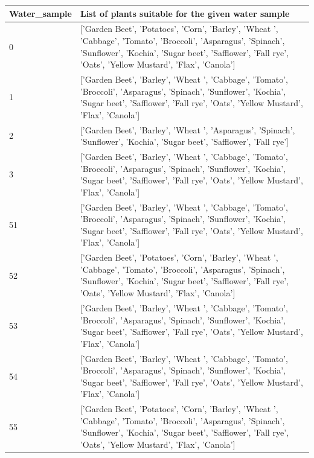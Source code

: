 \begin{table}[H]
    \centering
    \begin{tabular}{|m{}|m{}|}
    \hline
        \textbf{Water\_sample} & \textbf{List of plants suitable for the given water sample} \\ \hline
        0 & ['Garden Beet', 'Potatoes', 'Corn', 'Barley', 'Wheat ', 'Cabbage', 'Tomato', 'Broccoli', 'Asparagus', 'Spinach', 'Sunflower', 'Kochia', 'Sugar beet', 'Safflower', 'Fall rye', 'Oats', 'Yellow Mustard', 'Flax', 'Canola'] \\ \hline
        1 & ['Garden Beet', 'Barley', 'Wheat ', 'Cabbage', 'Tomato', 'Broccoli', 'Asparagus', 'Spinach', 'Sunflower', 'Kochia', 'Sugar beet', 'Safflower', 'Fall rye', 'Oats', 'Yellow Mustard', 'Flax', 'Canola'] \\ \hline
        2 & ['Garden Beet', 'Barley', 'Wheat ', 'Asparagus', 'Spinach', 'Sunflower', 'Kochia', 'Sugar beet', 'Safflower', 'Fall rye'] \\ \hline
        3 & ['Garden Beet', 'Barley', 'Wheat ', 'Cabbage', 'Tomato', 'Broccoli', 'Asparagus', 'Spinach', 'Sunflower', 'Kochia', 'Sugar beet', 'Safflower', 'Fall rye', 'Oats', 'Yellow Mustard', 'Flax', 'Canola'] \\ \hline
        51 & ['Garden Beet', 'Barley', 'Wheat ', 'Cabbage', 'Tomato', 'Broccoli', 'Asparagus', 'Spinach', 'Sunflower', 'Kochia', 'Sugar beet', 'Safflower', 'Fall rye', 'Oats', 'Yellow Mustard', 'Flax', 'Canola'] \\ \hline
        52 & ['Garden Beet', 'Potatoes', 'Corn', 'Barley', 'Wheat ', 'Cabbage', 'Tomato', 'Broccoli', 'Asparagus', 'Spinach', 'Sunflower', 'Kochia', 'Sugar beet', 'Safflower', 'Fall rye', 'Oats', 'Yellow Mustard', 'Flax', 'Canola'] \\ \hline
        53 & ['Garden Beet', 'Barley', 'Wheat ', 'Cabbage', 'Tomato', 'Broccoli', 'Asparagus', 'Spinach', 'Sunflower', 'Kochia', 'Sugar beet', 'Safflower', 'Fall rye', 'Oats', 'Yellow Mustard', 'Flax', 'Canola'] \\ \hline
        54 & ['Garden Beet', 'Barley', 'Wheat ', 'Cabbage', 'Tomato', 'Broccoli', 'Asparagus', 'Spinach', 'Sunflower', 'Kochia', 'Sugar beet', 'Safflower', 'Fall rye', 'Oats', 'Yellow Mustard', 'Flax', 'Canola'] \\ \hline
        55 & ['Garden Beet', 'Potatoes', 'Corn', 'Barley', 'Wheat ', 'Cabbage', 'Tomato', 'Broccoli', 'Asparagus', 'Spinach', 'Sunflower', 'Kochia', 'Sugar beet', 'Safflower', 'Fall rye', 'Oats', 'Yellow Mustard', 'Flax', 'Canola'] \\ \hline

\end{tabular}
\end{table}
